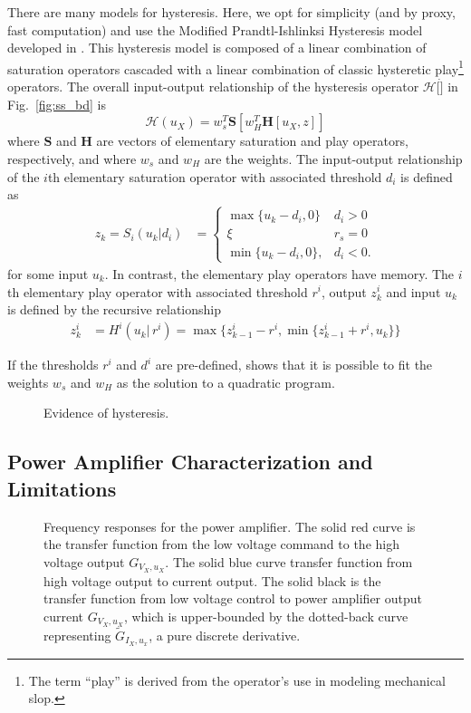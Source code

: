 \documentclass[journal,twocolumn,twoside]{IEEEtran}
\begin{document}
There are many models for hysteresis. Here, we opt for simplicity (and by proxy, fast computation) and use the Modified Prandtl-Ishlinksi Hysteresis model developed in \cite{kuhnen_modeling_2003}. This hysteresis model is composed of a linear combination of saturation operators cascaded with a linear combination of classic hysteretic play\footnote{The term ``play'' is derived from the operator's use in modeling mechanical slop.} operators. The overall input-output relationship of the hysteresis operator $\mathcal{H}[\dot]$ in Fig.~\ref{fig:ss_bd} is
\begin{equation}
  \mathcal{H}(u_X) = w_s^T\mathbf{S}\left[w_H^T \mathbf{H}[u_X, z]\right]
\end{equation}
where $\mathbf{S}$ and $\mathbf{H}$ are vectors of elementary saturation and play operators, respectively, and
where $w_s$ and $w_H$ are the weights. The input-output relationship of the $i$th elementary saturation operator with associated threshold $d_i$ is defined as
\begin{align}
  z_k=
  S_i(u_k|d_i) &=
  \begin{cases}
    \max\{u_k - d_i, 0\} & d_i >0\\
    \xi & r_s = 0\\
    \min\{u_k-d_i, 0\},  & d_i<0.
  \end{cases}
\end{align}
for some input $u_k$. 
In contrast, the elementary play operators have memory. The $i$th elementary play operator with associated threshold $r^i$, output $z_k^i$ and input $u_k$ is defined by the recursive relationship
\begin{align}
  z^i_k &=
  H^i(u_k|\, r^i) =
  \max\{z^i_{k-1}-r^i, \min\{z^i_{k-1} + r^i, u_k\} \}
\end{align}

If the thresholds $r^i$ and $d^i$ are pre-defined, \cite{kuhnen_modeling_2003} shows that it is possible to fit the weights $w_s$ and $w_H$ as the solution to a quadratic program.

\begin{figure}
  
  \caption{Evidence of hysteresis.}
  \label{fig:hyst_resp_dem}
\end{figure}


\subsection{Power Amplifier Characterization and Limitations}\label{sec:powcharct}
\begin{figure}[htbp]
\centering

\caption{\label{fig:orgc576458}
  Frequency responses for the power amplifier. The solid red curve is the transfer function from the low voltage command to the high voltage output $G_{V_X, u_X}$. The solid blue curve transfer function from high voltage output to current output. The solid black is the transfer function from low voltage control to power amplifier output current $G_{V_X, u_X}$, which is upper-bounded by the dotted-back curve representing $\tilde G_{I_X, u_x}$, a pure discrete derivative.}
\end{figure}
\end{document}
